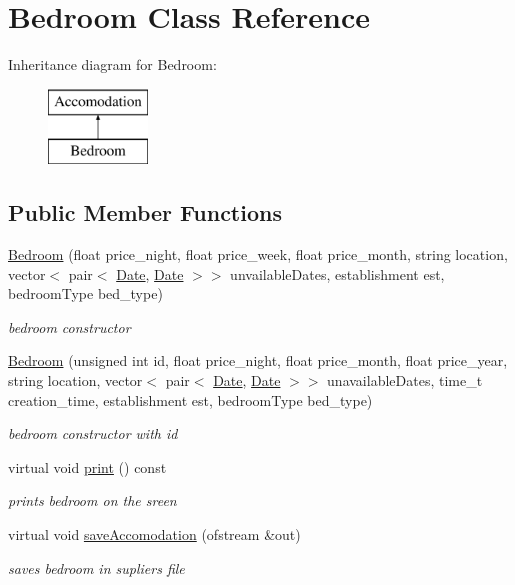 \hypertarget{class_bedroom}{}\section{Bedroom Class Reference}
\label{class_bedroom}
Inheritance diagram for Bedroom\+:\begin{figure}[H]
\begin{center}
\leavevmode
\includegraphics[height=2.000000cm]{class_bedroom}
\end{center}
\end{figure}
\subsection*{Public Member Functions}
\begin{DoxyCompactItemize}
\item 
\hyperlink{class_bedroom_afd743fa0003f9307e4244c22332e1450}{Bedroom} (float price\+\_\+night, float price\+\_\+week, float price\+\_\+month, string location, vector$<$ pair$<$ \hyperlink{class_date}{Date}, \hyperlink{class_date}{Date} $>$$>$ unvailable\+Dates, establishment est, bedroom\+Type bed\+\_\+type)
\begin{DoxyCompactList}\small\item\em bedroom constructor \end{DoxyCompactList}\item 
\hyperlink{class_bedroom_aa3387d7465f2c1ae00ecd37efe2ff53d}{Bedroom} (unsigned int id, float price\+\_\+night, float price\+\_\+month, float price\+\_\+year, string location, vector$<$ pair$<$ \hyperlink{class_date}{Date}, \hyperlink{class_date}{Date} $>$$>$ unavailable\+Dates, time\+\_\+t creation\+\_\+time, establishment est, bedroom\+Type bed\+\_\+type)
\begin{DoxyCompactList}\small\item\em bedroom constructor with id \end{DoxyCompactList}\item 
\hypertarget{class_bedroom_a227bb14fc225b8c872d85c84163735de}{}\label{class_bedroom_a227bb14fc225b8c872d85c84163735de} 
virtual void \hyperlink{class_bedroom_a227bb14fc225b8c872d85c84163735de}{print} () const
\begin{DoxyCompactList}\small\item\em prints bedroom on the sreen \end{DoxyCompactList}\item 
virtual void \hyperlink{class_bedroom_ad5d0a12fe0257ba5c14efc6182ee33ce}{save\+Accomodation} (ofstream \&out)
\begin{DoxyCompactList}\small\item\em saves bedroom in supliers file \end{DoxyCompactList}\end{DoxyCompactItemize}

